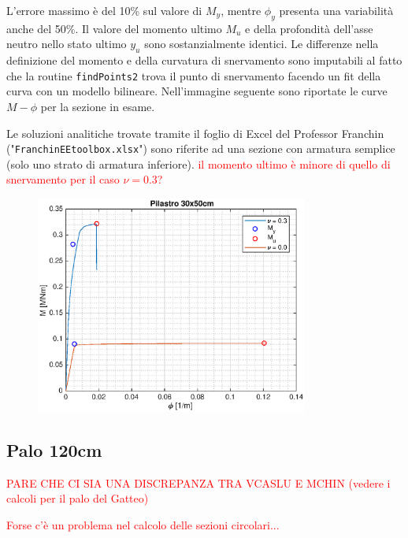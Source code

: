 \documentclass[10pt]{article}
\begin{document}
L'errore massimo è del 10\% sul valore di $M_y$, mentre $\phi_y$ presenta una variabilità anche del 50\%. Il valore del momento ultimo $M_u$ e della profondità dell'asse neutro nello stato ultimo $y_u$ sono sostanzialmente identici. Le differenze nella definizione del momento e della curvatura di snervamento sono imputabili al fatto che la routine \texttt{findPoints2} trova il punto di snervamento facendo un fit della curva con un modello bilineare. Nell'immagine seguente sono riportate le curve $M-\phi$ per la sezione in esame.

Le soluzioni analitiche trovate tramite il foglio di Excel del Professor Franchin ("\texttt{FranchinEEtoolbox.xlsx}") sono riferite ad una sezione con armatura semplice (solo uno strato di armatura inferiore). \textcolor{red}{il momento ultimo è  minore di quello di snervamento per il caso $\nu = 0.3$?}


\begin{figure}[H]
\centering
\includegraphics[width=0.8\textwidth]{img/pilastro30x50.eps}
\end{figure}




\subsection{Palo 120cm}

{\huge \textcolor{red}{PARE CHE CI SIA UNA DISCREPANZA TRA VCASLU E MCHIN (vedere i calcoli per il palo del Gatteo)}}

\begin{Large}
\textcolor{red}{Forse c'è un problema nel calcolo delle sezioni circolari...}
\end{Large}
\end{document}
